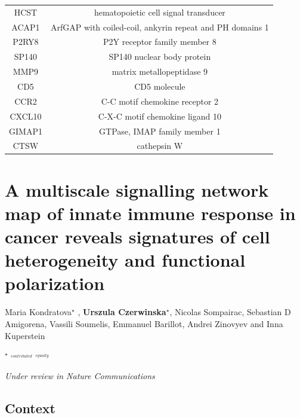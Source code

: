 \documentclass[12pt,]{book}
\theoremstyle{definition}
\theoremstyle{definition}
\theoremstyle{definition}
\theoremstyle{remark}
\begin{document}
\begin{longtable}[t]{cc}
\addlinespace
HCST & hematopoietic cell signal transducer\\
ACAP1 & ArfGAP with coiled-coil, ankyrin repeat and PH domains 1\\
P2RY8 & P2Y receptor family member 8\\
SP140 & SP140 nuclear body protein\\
MMP9 & matrix metallopeptidase 9\\
\addlinespace
CD5 & CD5 molecule\\
CCR2 & C-C motif chemokine receptor 2\\
CXCL10 & C-X-C motif chemokine ligand 10\\
GIMAP1 & GTPase, IMAP family member 1\\
CTSW & cathepsin W\\
\bottomrule
\end{longtable}

\hypertarget{map}{%
\chapter{A multiscale signalling network map of innate immune response
in cancer reveals signatures of cell heterogeneity and functional
polarization}\label{map}}


Maria Kondratova\(^\star\) , \textbf{Urszula Czerwinska\(^\star\)},
Nicolas Sompairac, Sebastian D Amigorena, Vassili Soumelis, Emmanuel
Barillot, Andrei Zinovyev and Inna Kuperstein

\(^\star\) \(^{_{contributed}}\) \(^{_{equally}}\)

\emph{Under review in Nature Communications}

\hypertarget{context-2}{%
\section{Context}\label{context-2}}
\end{document}
